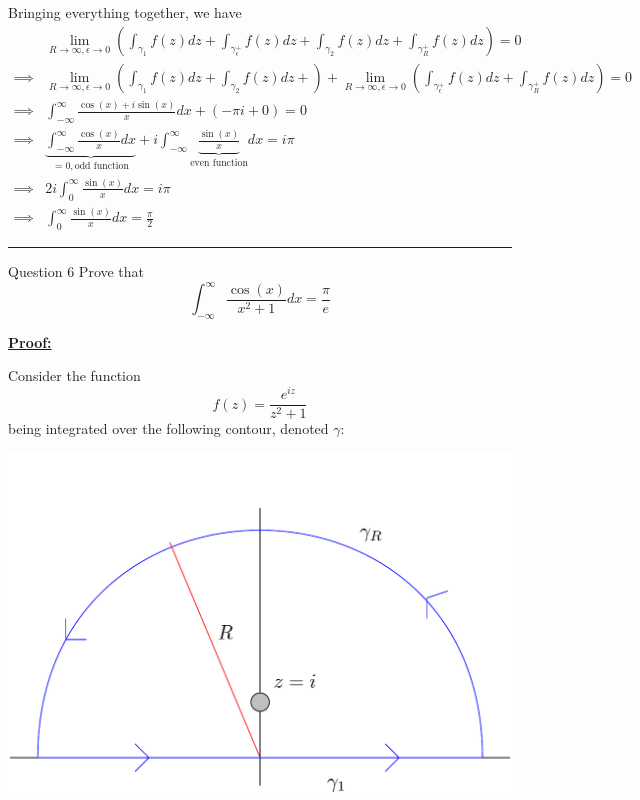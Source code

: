 \documentclass{article}
\begin{document}
\vskip 0.5cm
Bringing everything together, we have 
\begin{align*}
  & \lim_{R \rightarrow \infty, \epsilon \rightarrow 0} \left(\int_{{\gamma}_1} f(z) dz + \int_{{\gamma}_{\epsilon}^{+}} f(z) dz + \int_{{\gamma}_2} f(z) dz + \int_{{\gamma}_{R}^{+}} f(z) dz\right) = 0 \\
  \implies&  \lim_{R \rightarrow \infty, \epsilon \rightarrow 0} \left(\int_{{\gamma}_1} f(z) dz + \int_{{\gamma}_2} f(z) dz + \right) +  \lim_{R \rightarrow \infty, \epsilon \rightarrow 0} \left(\int_{{\gamma}_{\epsilon}^{+}} f(z) dz + \int_{{\gamma}_{R}^{+}} f(z) dz\right) = 0 \\
  \implies &\int_{-\infty}^{\infty} \frac{\cos(x) + i\sin(x)}{x} dx + \left(-\pi i + 0 \right) = 0 \\
  \implies & \underbrace{\int_{-\infty}^{\infty} \frac{\cos(x)}{x} dx }_{=0, \text{odd function}} + i\int_{-\infty}^{\infty} \underbrace{\frac{\sin(x)}{x}}_{\text{even function}} dx = i \pi \\
  \implies &2i\int_{0}^{\infty} \frac{\sin(x)}{x} dx = i \pi \\
  \implies & \boxed{ \int_{0}^{\infty} \frac{\sin(x)}{x} dx = \frac{\pi}{2} }
\end{align*}

\vskip 0.5cm
\hrule 
\vskip 0.5cm


\begin{mathdefinitionbox}{Question 6}
\vskip 0.5cm
Prove that 
\[ \int_{-\infty}^{\infty} \frac{\cos\left(x\right)}{x^2 + 1} dx = \frac{\pi}{e} \]
\end{mathdefinitionbox}

\vskip 0.5cm
\underline{\textbf{Proof:}}

Consider the function \[ f(z) = \frac{e^{iz}}{z^2 + 1} \] being integrated over the following contour, denoted $\gamma$:

\begin{center}
  \includegraphics*[scale=0.30]{Q6.png}
\end{center}
\end{document}
